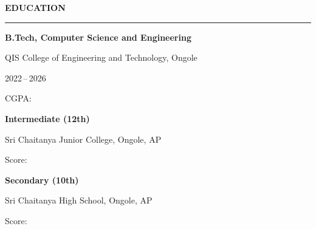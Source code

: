 \documentclass[a4paper]{article}
\newcommand{\sidehead}[1]{%
    {\color{navy}\bfseries\normalsize #1}\par
    \vspace{2pt}%
    {\color{navy}\rule{\linewidth}{0.65pt}}%
    \vspace{4pt}\par
}
\begin{document}
\vspace{5pt}

\noindent
{}

\vspace{3pt}


\noindent
\begin{minipage}[t]{75mm}

    \hspace*{8mm}%
    \begin{minipage}[t]{60mm}
        \small

        \vspace{3pt}

        \sidehead{EDUCATION}

        \textbf{B.Tech, Computer Science and Engineering}\par
        \vspace{1pt}
        QIS College of Engineering and Technology, Ongole\par
        \vspace{1pt}
        2022\,--\,2026\par
        \vspace{1pt}
        CGPA:

        \vspace{5pt}

        \textbf{Intermediate (12th)}\par
        \vspace{1pt}
        Sri Chaitanya Junior College, Ongole, AP\par
        \vspace{1pt}
        Score:

        \vspace{5pt}

        \textbf{Secondary (10th)}\par
        \vspace{1pt}
        Sri Chaitanya High School, Ongole, AP\par
        \vspace{1pt}
        Score:


\end{minipage}
\end{minipage}
\end{document}

